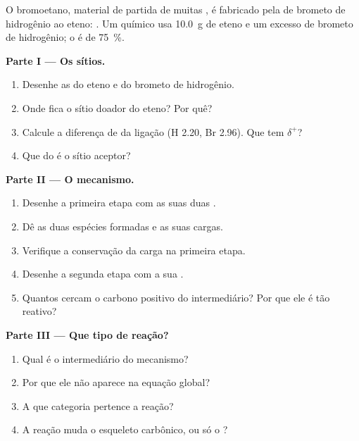 \begin{problem}
\label{pb:g12:curly-arrows:1}
O bromoetano, material de partida de muitas , é fabricado pela
 de brometo de hidrogênio ao eteno:
. Um químico usa \qty{10.0}{g} de eteno
e um excesso de brometo de hidrogênio; o  é de
\qty{75}{\percent}.

\medskip
\noindent\textbf{Parte I --- Os sítios.}
\begin{enumerate}
  \item Desenhe as  do eteno e do brometo de
        hidrogênio.
  \item Onde fica o sítio doador do eteno? Por quê?
  \item Calcule a diferença de  da ligação 
        (H 2.20, Br 2.96). Que  tem $\delta^+$?
  \item Que  do  é o sítio aceptor?
\end{enumerate}

\medskip
\noindent\textbf{Parte II --- O mecanismo.}
\begin{enumerate}[resume]
  \item Desenhe a primeira etapa com as suas duas .
  \item Dê as duas espécies formadas e as suas cargas.
  \item Verifique a conservação da carga na primeira etapa.
  \item Desenhe a segunda etapa com a sua .
  \item Quantos  cercam o carbono positivo do intermediário? Por
        que ele é tão reativo?
\end{enumerate}

\medskip
\noindent\textbf{Parte III --- Que tipo de reação?}
\begin{enumerate}[resume]
  \item Qual é o intermediário do mecanismo?
  \item Por que ele não aparece na equação global?
  \item A que categoria pertence a reação?
  \item A reação muda o esqueleto carbônico, ou só o ?
\end{enumerate}


\end{problem}

